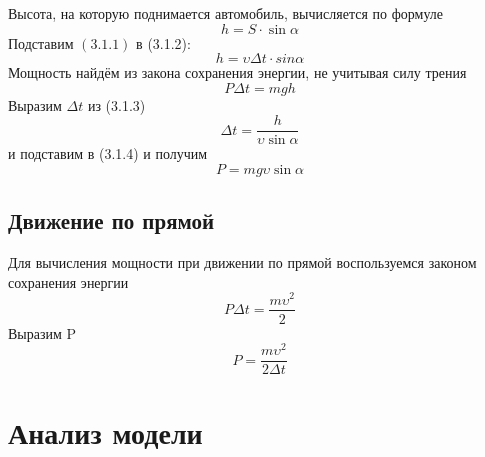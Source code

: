 \documentclass[a4paper, 14pt]{extarticle}
\begin{document}
			Высота, на которую поднимается автомобиль, вычисляется по формуле
			\[ h = S \cdot \sin{\alpha} \tag{3.1.2} \label{eq:special}\]
			Подставим \( (3.1.1) \) в (3.1.2):
			\[ h = \upsilon \Delta t \cdot sin{\alpha}  \tag{3.1.3} \label{eq:special} \]
			Мощность найдём из закона сохранения энергии, не учитывая силу трения
			\[ P \Delta t = mgh  \tag{3.1.4} \label{eq:special}\]
			Выразим \( \Delta t\) из (3.1.3)
			\[ \Delta t = \dfrac{h}{\upsilon \sin{\alpha}} \tag{3.1.5} \label{eq:special} \]
			и подставим в (3.1.4) и получим
			\[ P = mg \upsilon \sin{\alpha} \tag{3.1.6} \label{eq:special} \]
		\subsection{Движение по прямой}
			Для вычисления мощности при движении по прямой воспользуемся
			законом сохранения энергии
			\[ P \Delta t = \dfrac{m\upsilon^2}{2} \tag{3.2.1} \label{eq:special} \]
			Выразим P
			\[ P = \dfrac{m\upsilon^2}{2\Delta t} \tag{3.2.2} \label{eq:special} \]

	\section{Анализ модели}
		
			

	
\end{document}
